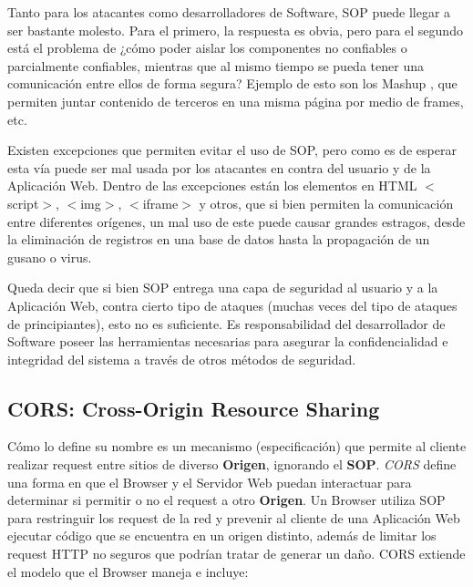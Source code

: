     
    Tanto para los atacantes como desarrolladores de Software, SOP puede llegar a ser bastante molesto. Para el primero, la respuesta es obvia, pero para el segundo está el problema de ¿cómo poder aislar los componentes no confiables o parcialmente confiables, mientras que al mismo tiempo se pueda tener una comunicación entre ellos de forma segura? Ejemplo de esto son los Mashup \cite{barth2009securing}, que permiten juntar contenido de terceros en una misma página por medio de frames, etc. 
        
    Existen excepciones que permiten evitar el uso de SOP, pero como es de esperar esta vía puede ser mal usada por los atacantes en contra del usuario y de la Aplicación Web. Dentro de las excepciones están los elementos en HTML \(<\)script\(>\), \(<\)img\(>\), \(<\)iframe\(>\) y otros, que si bien permiten la comunicación entre diferentes orígenes, un mal uso de este puede causar grandes estragos, desde la eliminación de registros en una base de datos hasta la propagación de un gusano o virus.
        
    Queda decir que si bien SOP entrega una capa de seguridad al usuario y a la Aplicación Web, contra cierto tipo de ataques (muchas veces del tipo de ataques de principiantes), esto no es suficiente. Es responsabilidad del desarrollador de Software poseer las herramientas necesarias para asegurar la confidencialidad e integridad del sistema a través de otros métodos de seguridad.



\subsection{CORS: Cross-Origin Resource Sharing}
\label{chap2:CORS}
    Cómo lo define su nombre es un mecanismo (especificación) que permite al cliente realizar request entre sitios de diverso \textbf{Origen}, ignorando el \textbf{SOP}. \textit{CORS} define una forma en que el Browser y el Servidor Web puedan interactuar para determinar si permitir o no el request a otro \textbf{Origen}. Un Browser utiliza SOP para restringuir los request de la red y prevenir al cliente de una Aplicación Web ejecutar código que se encuentra en un origen distinto, además de limitar los request HTTP no seguros que podrían tratar de generar un daño. CORS extiende el modelo que el Browser maneja e incluye:
        
